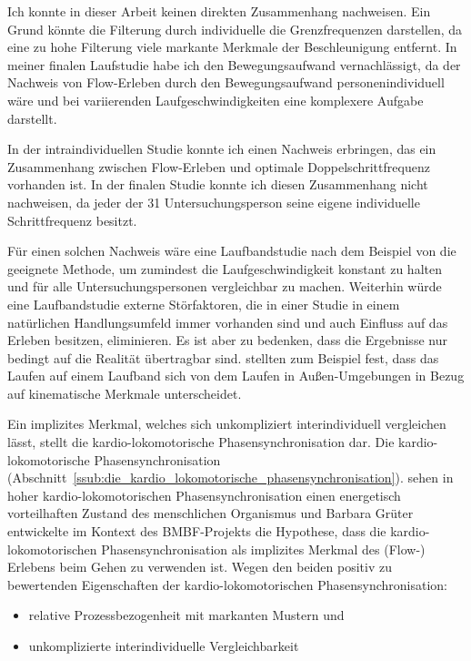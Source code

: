 Ich konnte in dieser Arbeit keinen direkten Zusammenhang nachweisen. Ein Grund könnte die Filterung durch individuelle die Grenzfrequenzen darstellen, da eine zu hohe Filterung viele markante Merkmale der Beschleunigung entfernt. In meiner finalen Laufstudie habe ich den Bewegungsaufwand vernachlässigt, da der Nachweis von Flow-Erleben durch den Bewegungsaufwand personenindividuell wäre und bei variierenden Laufgeschwindigkeiten eine komplexere Aufgabe darstellt.

In der intraindividuellen Studie konnte ich einen Nachweis erbringen, das ein Zusammenhang zwischen Flow-Erleben und optimale Doppelschrittfrequenz vorhanden ist. In der finalen Studie konnte ich diesen Zusammenhang nicht nachweisen, da jeder der 31 Untersuchungsperson seine eigene individuelle Schrittfrequenz besitzt. 

Für einen solchen Nachweis wäre eine Laufbandstudie nach dem Beispiel von \citet{Reinhardt2006} die geeignete Methode, um zumindest die Laufgeschwindigkeit konstant zu halten und für alle Untersuchungspersonen vergleichbar zu machen. Weiterhin würde eine Laufbandstudie externe Störfaktoren, die in einer Studie in einem natürlichen Handlungsumfeld immer vorhanden sind und auch Einfluss auf das Erleben besitzen, eliminieren. Es ist aber zu bedenken, dass die Ergebnisse nur bedingt auf die Realität übertragbar sind. \citet{Strohrmann2012} stellten zum Beispiel fest, dass das Laufen auf einem Laufband sich von dem Laufen in Außen-Umgebungen in Bezug auf kinematische Merkmale unterscheidet. 

Ein implizites Merkmal, welches sich unkompliziert interindividuell vergleichen lässt, stellt die kardio-lokomotorische Phasensynchronisation dar. Die kardio-lokomotorische Phasensynchronisation (Abschnitt~\ref{ssub:die_kardio_lokomotorische_phasensynchronisation}). \citet[][S.~18]{Niizeki2014} sehen in hoher kardio-lokomotorischen Phasensynchronisation einen energetisch vorteilhaften Zustand des menschlichen Organismus und Barbara Grüter entwickelte im Kontext des \acs{BMBF}-Projekts die Hypothese, dass die kardio-lokomotorischen Phasensynchronisation als implizites Merkmal des (Flow-) Erlebens beim Gehen zu verwenden ist. Wegen den beiden positiv zu bewertenden Eigenschaften der kardio-lokomotorischen Phasensynchronisation: 
\begin{itemize}
	
	\item relative Prozessbezogenheit mit markanten Mustern und
	
	\item unkomplizierte interindividuelle Vergleichbarkeit 
\end{itemize}

